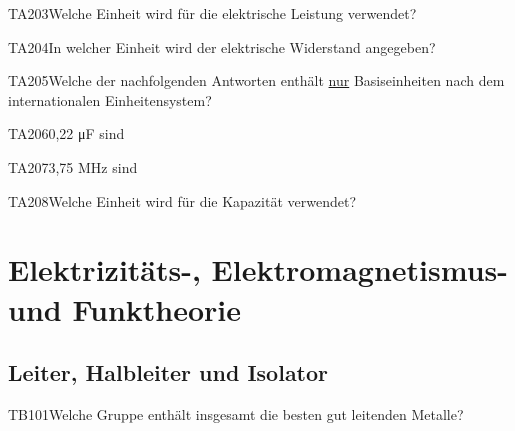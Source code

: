 \begin{question}{TA203}{Welche Einheit wird für die elektrische Leistung verwendet?}
\end{question}

\begin{question}{TA204}{In welcher Einheit wird der elektrische Widerstand angegeben?}
\end{question}

\begin{question}{TA205}{Welche der nachfolgenden Antworten enthält \ul{nur} Basiseinheiten nach dem internationalen Einheitensystem?}
\end{question}

\begin{question}{TA206}{0,22 μF sind}
\end{question}

\begin{question}{TA207}{3,75 MHz sind}
\end{question}

\begin{question}{TA208}{Welche Einheit wird für die Kapazität verwendet?}
\end{question}

\section{Elektrizitäts-, Elektromagnetismus- und Funktheorie}

\subsection{Leiter, Halbleiter und Isolator}

\begin{question}{TB101}{Welche Gruppe enthält insgesamt die besten gut leitenden Metalle?}
\end{question}

